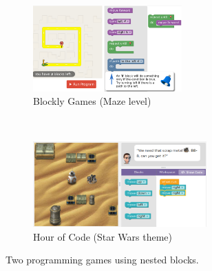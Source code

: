 \begin{figure}[htb]
\centering
\begin{subfigure}[t]{0.43\textwidth}
\centering
\includegraphics[height=33mm]{img/blockly-nested}
\caption{Blockly Games (Maze level)}
\label{fig:blockly-games}
\end{subfigure}%
~
\begin{subfigure}[t]{0.57\textwidth}
\centering
\includegraphics[height=33mm]{img/hour-of-code-sw}
\caption{Hour of Code (Star Wars theme)}
\label{fig:hoc}
\end{subfigure}
\caption{Two programming games using nested blocks.}
\label{fig:blockly-hoc}
\end{figure}



